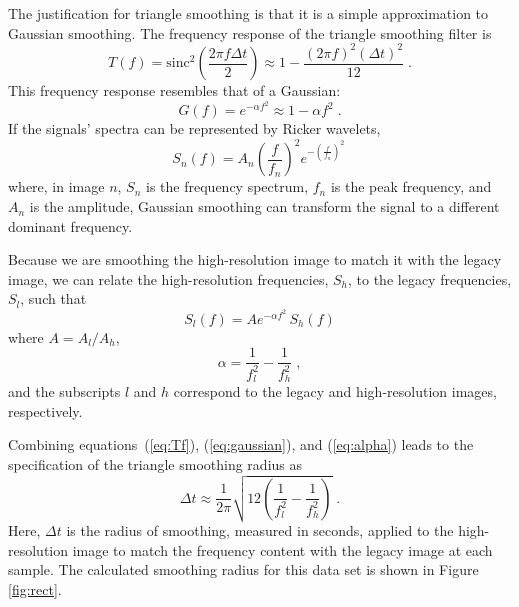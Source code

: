 
The justification for triangle smoothing is that it is a simple approximation to Gaussian smoothing. The frequency response of the triangle smoothing filter \cite[]{pvi} is
\begin{equation}
\label{eq:Tf}
T(f) = \mathrm{sinc}^2\left(\frac{2\pi f \Delta t}{2}\right) \approx 1-\frac{(2\pi f)^2(\Delta t)^2}{12}\;.
\end{equation}
This frequency response resembles that of a Gaussian:
\begin{equation}
\label{eq:gaussian}
G(f) = e^{-\alpha f^2} \approx 1 - \alpha f^2\;.
\end{equation}
If the signals' spectra can be represented by Ricker wavelets,
\begin{equation}
\label{eq:Sn}
S_{n}(f) = A_{n} \left(\frac{f}{f_{n}}\right)^2e^{-\left(\frac{f}{f_{n}}\right)^{2}}\,
\end{equation}
where, in image $n$, $S_n$ is the frequency spectrum, $f_n$ is the peak frequency, and $A_n$ is the amplitude, Gaussian smoothing can transform the signal to a different dominant frequency.

Because we are smoothing the high-resolution image to match it with the legacy image, we can relate the high-resolution frequencies, $S_h$, to the legacy frequencies, $S_l$, such that
\begin{equation}
\label{eq:smooth}
S_{l}(f)=A e^{-\alpha f^2}\,S_h(f)
\end{equation}
where $A=A_l/A_h$,
\begin{equation}
\label{eq:alpha}
\alpha = \frac{1}{f_l^2}-\frac{1}{f_h^2} \;,
\end{equation}
and the subscripts $l$ and $h$ correspond to the legacy and high-resolution images, respectively.

Combining equations~(\ref{eq:Tf}), (\ref{eq:gaussian}), and (\ref{eq:alpha}) leads to the specification of the triangle smoothing radius as
\begin{equation}
\label{eq:radius}
\Delta t \approx \frac{1}{2\pi}\sqrt{12\left(\frac{1}{f_{l}^{2}}-\frac{1}{f_{h}^{2}}\right)}\;.
\end{equation}
Here, $\Delta t$ is the radius of smoothing, measured in seconds, applied to the high-resolution image to match the frequency content with the legacy image at each sample.
The calculated smoothing radius for this data set is shown in Figure \ref{fig:rect}.

